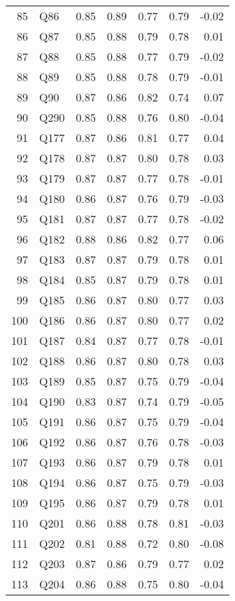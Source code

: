 \documentclass{amsart}
\begin{document}
\begin{table}[ht]
\begin{tabular}{rlrrrrr}
  85 & Q86 & 0.85 & 0.89 & 0.77 & 0.79 & -0.02 \\ 
  86 & Q87 & 0.85 & 0.88 & 0.79 & 0.78 & 0.01 \\ 
  87 & Q88 & 0.85 & 0.88 & 0.77 & 0.79 & -0.02 \\ 
  88 & Q89 & 0.85 & 0.88 & 0.78 & 0.79 & -0.01 \\ 
  89 & Q90 & 0.87 & 0.86 & 0.82 & 0.74 & 0.07 \\ 
  90 & Q290 & 0.85 & 0.88 & 0.76 & 0.80 & -0.04 \\ 
  91 & Q177 & 0.87 & 0.86 & 0.81 & 0.77 & 0.04 \\ 
  92 & Q178 & 0.87 & 0.87 & 0.80 & 0.78 & 0.03 \\ 
  93 & Q179 & 0.87 & 0.87 & 0.77 & 0.78 & -0.01 \\ 
  94 & Q180 & 0.86 & 0.87 & 0.76 & 0.79 & -0.03 \\ 
  95 & Q181 & 0.87 & 0.87 & 0.77 & 0.78 & -0.02 \\ 
  96 & Q182 & 0.88 & 0.86 & 0.82 & 0.77 & 0.06 \\ 
  97 & Q183 & 0.87 & 0.87 & 0.79 & 0.78 & 0.01 \\ 
  98 & Q184 & 0.85 & 0.87 & 0.79 & 0.78 & 0.01 \\ 
  99 & Q185 & 0.86 & 0.87 & 0.80 & 0.77 & 0.03 \\ 
  100 & Q186 & 0.86 & 0.87 & 0.80 & 0.77 & 0.02 \\ 
  101 & Q187 & 0.84 & 0.87 & 0.77 & 0.78 & -0.01 \\ 
  102 & Q188 & 0.86 & 0.87 & 0.80 & 0.78 & 0.03 \\ 
  103 & Q189 & 0.85 & 0.87 & 0.75 & 0.79 & -0.04 \\ 
  104 & Q190 & 0.83 & 0.87 & 0.74 & 0.79 & -0.05 \\ 
  105 & Q191 & 0.86 & 0.87 & 0.75 & 0.79 & -0.04 \\ 
  106 & Q192 & 0.86 & 0.87 & 0.76 & 0.78 & -0.03 \\ 
  107 & Q193 & 0.86 & 0.87 & 0.79 & 0.78 & 0.01 \\ 
  108 & Q194 & 0.86 & 0.87 & 0.75 & 0.79 & -0.03 \\ 
  109 & Q195 & 0.86 & 0.87 & 0.79 & 0.78 & 0.01 \\ 
  110 & Q201 & 0.86 & 0.88 & 0.78 & 0.81 & -0.03 \\ 
  111 & Q202 & 0.81 & 0.88 & 0.72 & 0.80 & -0.08 \\ 
  112 & Q203 & 0.87 & 0.86 & 0.79 & 0.77 & 0.02 \\ 
  113 & Q204 & 0.86 & 0.88 & 0.75 & 0.80 & -0.04 \\ 

\end{tabular}
\end{table}
\end{document}
